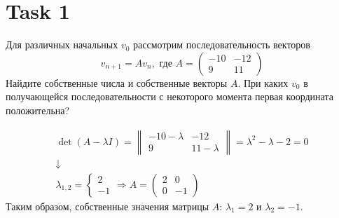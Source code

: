 \section{Task 1}
\begin{task}
    Для различных начальных $v_0$ рассмотрим последовательность векторов $$v_{n+1}=Av_n, \text{ где } A =\begin{pmatrix}-10&-12\\9&11\end{pmatrix}$$ Найдите собственные числа и собственные векторы $A$. При каких $v_0$ в получающейся последовательности с некоторого момента первая координата положительна?
\end{task}

\begin{solution}
    \begin{gather}
        \det(A-\lambda I) = 
        \begin{Vmatrix}
            -10-\lambda & -12 \\ 9 & 11-\lambda
        \end{Vmatrix} = \lambda^2-\lambda-2=0 \\
        \downarrow \\
        \lambda_{1,2} = 
        \begin{cases}
            2 \\ -1
        \end{cases} \Longrightarrow A = 
        \begin{pmatrix}
            2 & 0 \\
            0 & -1
        \end{pmatrix}
    \end{gather}
    Таким образом, собственные значения матрицы $A$: $\lambda_1 = 2$ и $\lambda_2 = -1$.
    

\end{solution}
